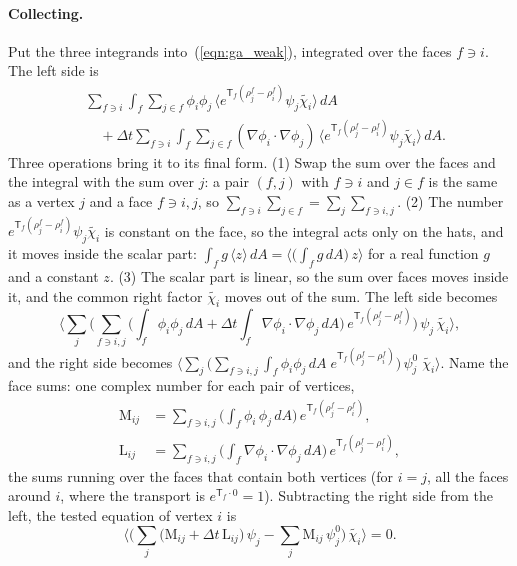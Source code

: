 \paragraph{Collecting.} Put the three integrands into~(\ref{eqn:ga_weak}), integrated over the faces $f\ni i$. The left side is
\begin{align*}
&\sum_{f\ni i}\int_f\sum_{j\in f}\phi_i\phi_j\,\big\langle e^{\mathsf T_f(\rho_j^f - \rho_i^f)}\psi_j\widetilde{\chi_i}\big\rangle\, dA \\
&\quad + \Delta t\sum_{f\ni i}\int_f\sum_{j\in f}(\nabla\phi_i\cdot\nabla\phi_j)\,\big\langle e^{\mathsf T_f(\rho_j^f - \rho_i^f)}\psi_j\widetilde{\chi_i}\big\rangle\, dA .
\end{align*}
Three operations bring it to its final form. (1) Swap the sum over the faces and the integral with the sum over $j$: a pair $(f, j)$ with $f\ni i$ and $j\in f$ is the same as a vertex $j$ and a face $f\ni i, j$, so $\sum_{f\ni i}\sum_{j\in f} = \sum_j\sum_{f\ni i, j}$. (2) The number $e^{\mathsf T_f(\rho_j^f - \rho_i^f)}\psi_j\widetilde{\chi_i}$ is constant on the face, so the integral acts only on the hats, and it moves inside the scalar part: $\int_f g\,\langle z\rangle\, dA = \big\langle\big(\int_f g\, dA\big)\, z\big\rangle$ for a real function $g$ and a constant $z$. (3) The scalar part is linear, so the sum over faces moves inside it, and the common right factor $\widetilde{\chi_i}$ moves out of the sum. The left side becomes
\begin{equation*}
\Big\langle\sum_j\Big(\sum_{f\ni i, j}\Big(\int_f\phi_i\phi_j\, dA + \Delta t\int_f\nabla\phi_i\cdot\nabla\phi_j\, dA\Big)\, e^{\mathsf T_f(\rho_j^f - \rho_i^f)}\Big)\,\psi_j\,\widetilde{\chi_i}\Big\rangle ,
\end{equation*}
and the right side becomes $\big\langle\sum_j\big(\sum_{f\ni i, j}\int_f\phi_i\phi_j\, dA\; e^{\mathsf T_f(\rho_j^f - \rho_i^f)}\big)\,\psi^0_j\;\widetilde{\chi_i}\big\rangle$. Name the face sums: one complex number for each pair of vertices,
\begin{equation}
\label{eqn:r2_global}
\begin{aligned}
\mathrm M_{ij} &= \sum_{f \ni i, j} \Big(\int_f \phi_i\,\phi_j\, dA\Big)\, e^{\mathsf T_f (\rho_j^f - \rho_i^f)}, \\
\mathrm L_{ij} &= \sum_{f \ni i, j} \Big(\int_f \nabla\phi_i\cdot\nabla\phi_j\, dA\Big)\, e^{\mathsf T_f (\rho_j^f - \rho_i^f)} ,
\end{aligned}
\end{equation}
the sums running over the faces that contain both vertices (for $i = j$, all the faces around $i$, where the transport is $e^{\mathsf T_f\cdot 0} = 1$). Subtracting the right side from the left, the tested equation of vertex $i$ is
\begin{equation}
\label{eqn:r2_tested}
\Big\langle \Big(\sum_j \big(\mathrm M_{ij} + \Delta t\,\mathrm L_{ij}\big)\,\psi_j - \sum_j \mathrm M_{ij}\,\psi^0_j\Big)\,\widetilde{\chi_i}\Big\rangle = 0 .
\end{equation}

